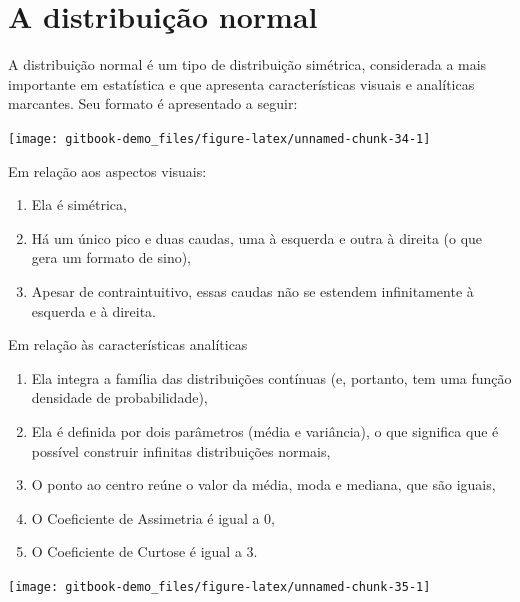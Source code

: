 \documentclass[
]{book}
\providecommand{\tightlist}{%
  \setlength{\itemsep}{0pt}\setlength{\parskip}{0pt}}
\begin{document}
\hypertarget{a-distribuiuxe7uxe3o-normal}{%
\section{A distribuição normal}\label{a-distribuiuxe7uxe3o-normal}}

A distribuição normal é um tipo de distribuição simétrica, considerada a mais importante em estatística e que apresenta características visuais e analíticas marcantes. Seu formato é apresentado a seguir:

\begin{center}\texttt{[image: gitbook-demo\_files/figure-latex/unnamed-chunk-34-1]} \end{center}

Em relação aos aspectos visuais:

\begin{enumerate}
\def\labelenumi{\arabic{enumi})}
\tightlist
\item
  Ela é simétrica,\\
\item
  Há um único pico e duas caudas, uma à esquerda e outra à direita (o que gera um formato de sino),\\
\item
  Apesar de contraintuitivo, essas caudas não se estendem infinitamente à esquerda e à direita.
\end{enumerate}

Em relação às características analíticas

\begin{enumerate}
\def\labelenumi{\arabic{enumi})}
\tightlist
\item
  Ela integra a família das distribuições contínuas (e, portanto, tem uma função densidade de probabilidade),
\item
  Ela é definida por dois parâmetros (média e variância), o que significa que é possível construir infinitas distribuições normais,\\
\item
  O ponto ao centro reúne o valor da média, moda e mediana, que são iguais,\\
\item
  O Coeficiente de Assimetria é igual a 0,\\
\item
  O Coeficiente de Curtose é igual a 3.
\end{enumerate}

\begin{center}\texttt{[image: gitbook-demo\_files/figure-latex/unnamed-chunk-35-1]} \end{center}
\end{document}
